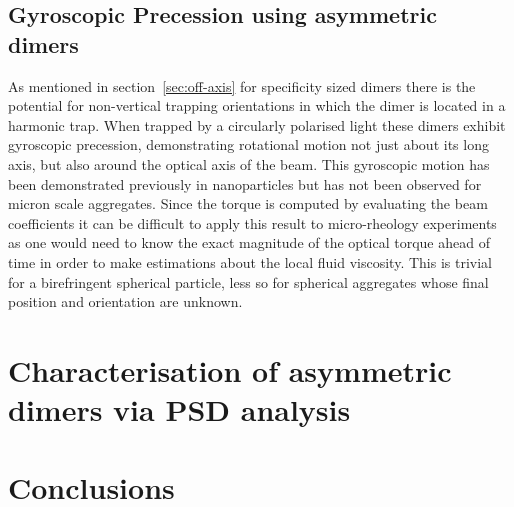 \subsection{Gyroscopic Precession using asymmetric dimers}
As mentioned in section~\ref{sec:off-axis} for specificity sized dimers 
there is the potential for non-vertical trapping orientations in which 
the dimer is located in a harmonic trap. When trapped by a circularly 
polarised light these dimers exhibit gyroscopic precession, demonstrating 
rotational motion not just about its long axis, but also around the 
optical axis of the beam. This gyroscopic motion has been demonstrated 
previously in nanoparticles \cite{Zhu2021, Rashid2018, Hoang2016, Kuhn2016} 
but has not been observed for micron scale aggregates. Since the torque is 
computed by evaluating the beam coefficients it can be difficult to 
apply this result to micro-rheology experiments as one would need to know
the exact magnitude of the optical torque ahead of time in order to make
estimations about the local fluid viscosity. This is trivial for a birefringent
spherical particle, less so for spherical aggregates whose final position and 
orientation are unknown.


\section{Characterisation of asymmetric dimers via PSD analysis}


\section{Conclusions}

